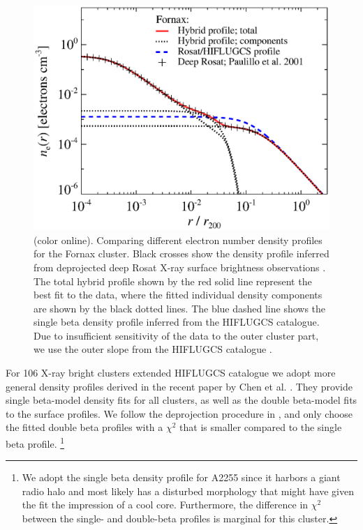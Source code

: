 \documentclass[10pt,aps,pra,reprint,amsmath,amsfonts,amssymb,showpacs,nofootinbib,floatfix]{revtex4-1}
\newcommand{\colo}{(color online). }
\begin{document}
\begin{figure}%
 \includegraphics[width=0.99\columnwidth]{figures/dens.fornax.bw.eps}
 \caption{\colo Comparing different electron number
   density profiles for the Fornax cluster. Black crosses show the
   density profile inferred from deprojected deep Rosat X-ray surface
   brightness observations \protect \cite{2002ApJ...565..883P}. The
   total hybrid profile shown by the red solid line represent the best
   fit to the data, where the fitted individual density components are
   shown by the black dotted lines. The blue dashed line shows the
   single beta density profile inferred from the HIFLUGCS
   catalogue. Due to insufficient sensitivity of the data to the outer
   cluster part, we use the outer slope from the HIFLUGCS catalogue
   \cite{2007A&A...466..805C}.}
 \label{fig:dens_fornax}
\end{figure}

For 106 X-ray bright clusters extended HIFLUGCS catalogue we adopt
more general density profiles derived in the recent paper by Chen et
al. \cite{2007A&A...466..805C}. They provide single beta-model density
fits for all clusters, as well as the double beta-model fits to the
surface profiles. We follow the deprojection procedure in
\cite{2004A&A...413...17P}, and only choose the fitted double beta
profiles with a $\chi^2$ that is smaller compared to the single beta
profile. \footnote{We adopt the single beta density profile for A2255
  since it harbors a giant radio halo and most likely has a disturbed
  morphology that might have given the fit the impression of a cool
  core. Furthermore, the difference in $\chi^2$ between the single-
  and double-beta profiles is marginal for this cluster.}
\end{document}
